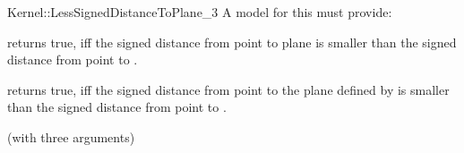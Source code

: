 \begin{ccRefFunctionObjectConcept}{Kernel::LessSignedDistanceToPlane_3}
A model for this must provide:


{returns true, iff the signed distance from point  to plane 
 is smaller than the signed distance from point  to .}

{returns true, iff the signed distance from point  to the plane
 defined by  is smaller than the signed distance 
from point  to .
}

\ccRefines
{} (with three arguments)

\ccSeeAlso
{}\\

\end{ccRefFunctionObjectConcept}
